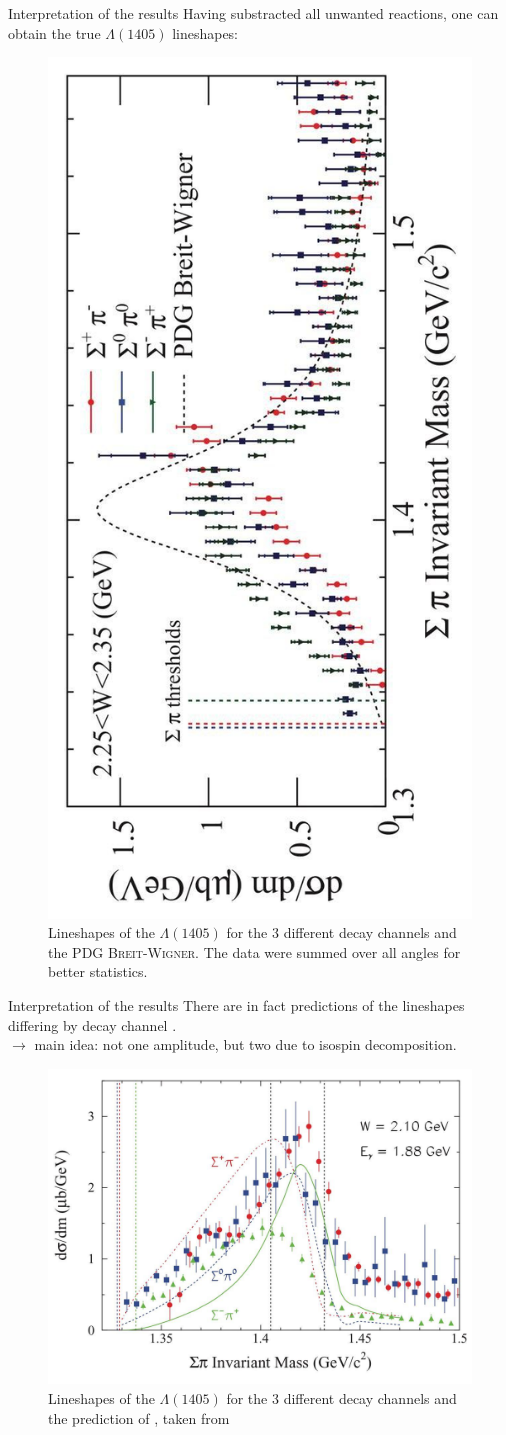 \documentclass[11pt,aspectratio=1610,dvipsnames]{beamer}
\begin{document}
\begin{frame}{Interpretation of the results}
	Having substracted all unwanted reactions, one can obtain the true $\Lambda(1405)$ lineshapes:
	\begin{figure}
		\centering
		\includegraphics[width=.4\linewidth,angle=270]{result}
		\caption{Lineshapes of the $\Lambda(1405)$ for the 3 different decay channels and the PDG \textsc{Breit-Wigner}. The data were summed over all angles for better statistics. \citet{lineshapes}}
	\end{figure}
\end{frame}
\begin{frame}{Interpretation of the results}
 There are in fact predictions of the lineshapes differing by decay channel \citet{nacher}. \\$\to$ main idea: not one amplitude, but two due to isospin decomposition.
	\begin{figure}
		\centering
		\includegraphics[width=.58\linewidth]{nacher}
		\caption{Lineshapes of the $\Lambda(1405)$ for the 3 different decay channels and the prediction of \citet{nacher}, taken from \citet{lineshapes}}
	\end{figure}
\end{frame}
\end{document}
